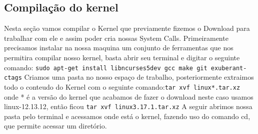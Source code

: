 \documentclass[12pt]{article}
\begin{document}
\subsection*{Compilação do kernel}
	Nesta seção vamos compilar o Kernel que previamente fizemos o Download para trabalhar com ele e assim poder cria nossas System Calls.
	Primeiramente precisamos instalar na nossa maquina um conjunto de ferramentas que nos permitira compilar nosso kernel, basta abrir seu terminal e digitar o seguinte comando:\newline
	\verb!sudo apt-­get install libncurses5­dev gcc make git exuberant­ctags! 
	Criamos uma pasta no nosso espaço de trabalho, posteriormente extraimos todo o conteudo do Kernel com o seguinte comando:\newline \verb!tar xvf linux­­*.tar.xz! \newline onde * é a versão do kernel que acabamos de fazer o download neste caso usamos linux-12.13.12, então ficou\newline
	\verb!tar xvf linux­3.17.1.tar.xz!\newline
	A seguir abrimos nossa pasta pelo terminal e acessamos onde está o kernel, fazendo uso do comando cd, que permite acessar um diretório.
\end{document}

